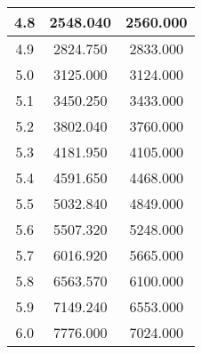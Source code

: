 \begin{table}[h!]
\begin{tabular}{|c|c|c|}
        4.8        & 2548.040       & 2560.000                          \\ \hline
        4.9        & 2824.750       & 2833.000                          \\ \hline
        5.0        & 3125.000       & 3124.000                          \\ \hline
        5.1        & 3450.250       & 3433.000                          \\ \hline
        5.2        & 3802.040       & 3760.000                          \\ \hline
        5.3        & 4181.950       & 4105.000                          \\ \hline
        5.4        & 4591.650       & 4468.000                          \\ \hline
        5.5        & 5032.840       & 4849.000                          \\ \hline
        5.6        & 5507.320       & 5248.000                          \\ \hline
        5.7        & 6016.920       & 5665.000                          \\ \hline
        5.8        & 6563.570       & 6100.000                          \\ \hline
        5.9        & 7149.240       & 6553.000                          \\ \hline
        6.0        & 7776.000       & 7024.000                          \\ \hline
    \end{tabular}\label{tab:table2}
\end{table}

